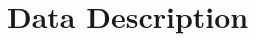 \documentclass[12pt, lot, lof]{thesis}\usepackage[]{graphicx}\usepackage[]{color}
\begin{document}
\singlespacing
\printbibliography

\cleardoublepage
\ifdefined{}
\else
\fi
{}

\appendix


\chapter{Data Description}
\label{ch:dataDesc}
\end{document}
